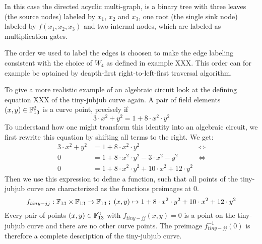 \begin{example}
In this case the directed acyclic multi-graph, is a binary tree with three leaves (the source nodes) labeled by $x_1$, $x_2$ and $x_3$, one root (the single sink node) labeled by $f(x_1,x_2,x_3)$ and two internal nodes, which are labeled as multiplication gates. 

The order we used to label the edges is choosen to make the edge labeling consistent with the choice of $W_4$ as defined in example XXX. This order can for example be optained by deapth-first right-to-left-first traversal algorithm.
\end{example}
\begin{example} To give a more realistic example of an algebraic circuit look at the defining equation XXX of the tiny-jubjub curve again. A pair of field elements 
$(x,y)\in \mathbb{F}_{13}^2$ is a curve point, precisely if
$$
3\cdot x^2 + y^2 = 1+ 8\cdot x^2\cdot y^2
$$ 
To understand how one might transform this identity into an algebraic circuit, we first rewrite this equation by shifting all terms to the right. We get:
\begin{align*}
3\cdot x^2 + y^2 & = 1+ 8\cdot x^2\cdot y^2 & \Leftrightarrow\\
0 & = 1+ 8\cdot x^2\cdot y^2 - 3\cdot x^2 - y^2 & \Leftrightarrow\\
0 & = 1+ 8\cdot x^2\cdot y^2 + 10\cdot x^2 +12\cdot y^2
\end{align*}
Then we use this expression to define a function, such that all points of the tiny-jubjub curve are characterized as the functions preimages at $0$.
$$
f_{tiny-jj}: \mathbb{F}_{13}\times \mathbb{F}_{13}\to \mathbb{F}_{13}\; ; \;
(x,y)\mapsto 1+ 8\cdot x^2\cdot y^2 + 10\cdot x^2 +12\cdot y^2
$$
Every pair of points $(x,y)\in \mathbb{F}_{13}^2$ with $f_{tiny-jj}(x,y)=0$ is a point on the tiny-jubjub curve and there are no other curve points. The preimage $f_{tiny-jj}^{-1}(0)$ is therefore a complete description of the tiny-jubjub curve.


\end{example}
